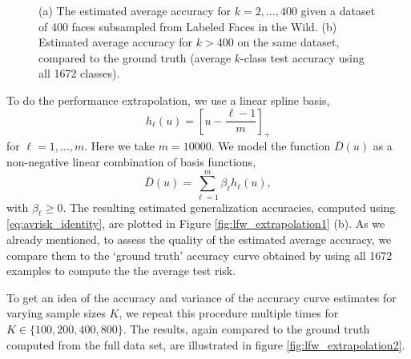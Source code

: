 \begin{figure}
\begin{tabular}{cc}
\end{tabular}
\caption{(a) The estimated average accuracy for $k = 2,\hdots,
  400$ given a dataset of 400 faces subsampled from Labeled Faces in
  the Wild.  (b) Estimated average accuracy for $k > 400$ on the
  same dataset, compared to the ground truth (average $k$-class test accuracy
  using all 1672 classes).}
\label{fig:lfw_extrapolation1}
\end{figure}

To do the performance extrapolation, we use a linear
spline basis,
\[
h_\ell(u) = \left[u - \frac{\ell - 1}{m}\right]_+
\]
for $\ell = 1,\hdots, m$.  Here we take $m = 10000$.  We model the
function $\bar{D}(u)$ as a non-negative linear combination of basis
functions,
\[
\bar{D}(u) = \sum_{\ell = 1}^m \beta_\ell h_\ell(u),
\]
with $\beta_\ell \geq 0$.  The resulting estimated generalization
accuracies, computed using \eqref{eq:avrisk_identity}, are plotted in
Figure \eqref{fig:lfw_extrapolation1} (b).  As we already mentioned, to
assess the quality of the estimated average accuracy, we compare them
to the `ground truth' accuracy curve obtained by using all 1672
examples to compute the the average test risk.



To get an idea of the accuracy and variance of the accuracy curve
estimates for varying sample sizes $K$, we repeat this procedure
multiple times for $K \in \{100,200,400, 800\}$.  The results, again
compared to the ground truth computed from the full data set, are
illustrated in figure \ref{fig:lfw_extrapolation2}.

